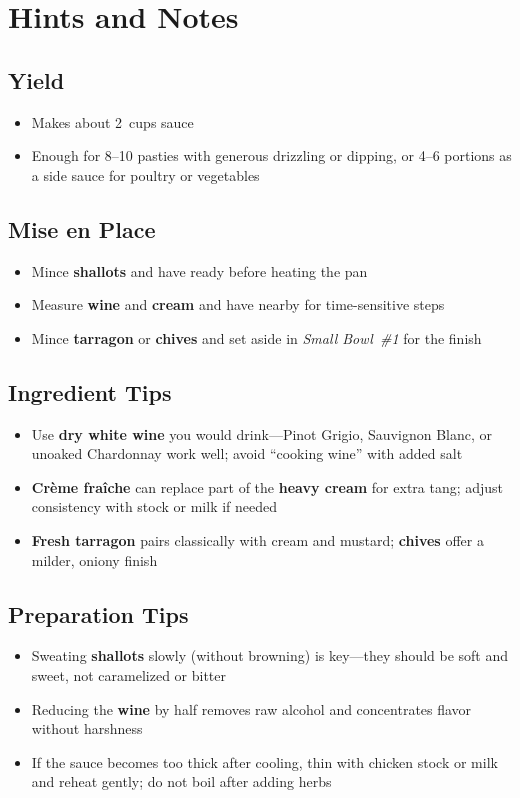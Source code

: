 \documentclass[11pt,letterpaper]{article}
\begin{document}
\section*{Hints and Notes}

\subsection*{Yield}
\begin{itemize}
    \item Makes about 2~cups sauce
    \item Enough for 8--10 pasties with generous drizzling or dipping, or 4--6 portions as a side sauce for poultry or vegetables
\end{itemize}

\subsection*{Mise en Place}
\begin{itemize}
    \item Mince \textbf{shallots} and have ready before heating the pan
    \item Measure \textbf{wine} and \textbf{cream} and have nearby for time-sensitive steps
    \item Mince \textbf{tarragon} or \textbf{chives} and set aside in \textit{Small Bowl~\#1} for the finish
\end{itemize}

\subsection*{Ingredient Tips}
\begin{itemize}
    \item Use \textbf{dry white wine} you would drink---Pinot Grigio, Sauvignon Blanc, or unoaked Chardonnay work well; avoid ``cooking wine'' with added salt
    \item \textbf{Crème fraîche} can replace part of the \textbf{heavy cream} for extra tang; adjust consistency with stock or milk if needed
    \item \textbf{Fresh tarragon} pairs classically with cream and mustard; \textbf{chives} offer a milder, oniony finish
\end{itemize}

\subsection*{Preparation Tips}
\begin{itemize}
    \item Sweating \textbf{shallots} slowly (without browning) is key---they should be soft and sweet, not caramelized or bitter
    \item Reducing the \textbf{wine} by half removes raw alcohol and concentrates flavor without harshness
    \item If the sauce becomes too thick after cooling, thin with chicken stock or milk and reheat gently; do not boil after adding herbs
\end{itemize}
\end{document}
